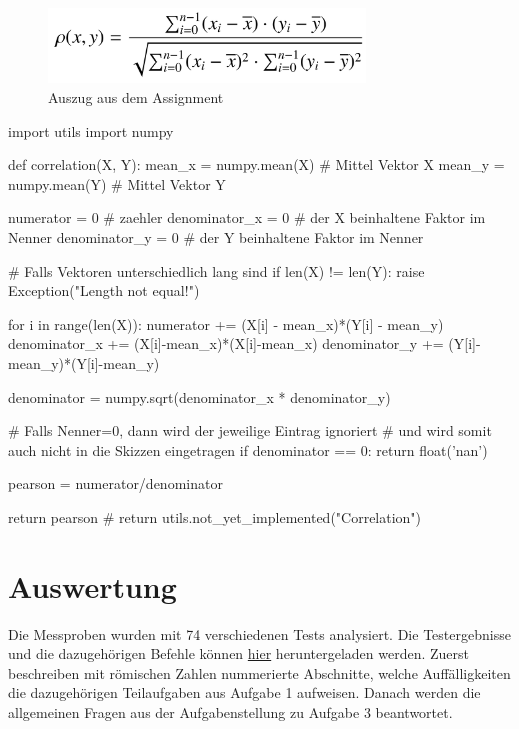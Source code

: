 \documentclass[12pt,a4paper]{article}
\begin{document}
\begin{figure}[hbt!]
	\centering
		\includegraphics[width=0.75\textwidth ]
		{Bilder/a2-pearson-formel.png}
		\caption{Auszug aus dem Assignment}
		\label{fig:Label1}
\end{figure}


\begin{python}
import utils
import numpy


def correlation(X, Y):
    mean_x = numpy.mean(X) # Mittel Vektor X
    mean_y = numpy.mean(Y) # Mittel Vektor Y

    numerator = 0 # zaehler
    denominator_x = 0 # der X beinhaltene Faktor im Nenner
    denominator_y = 0 # der Y beinhaltene Faktor im Nenner

    # Falls Vektoren unterschiedlich lang sind
    if len(X) != len(Y):
        raise Exception("Length not equal!\n")

    for i in range(len(X)):
        numerator += (X[i] - mean_x)*(Y[i] - mean_y)
        denominator_x += (X[i]-mean_x)*(X[i]-mean_x)
        denominator_y += (Y[i]-mean_y)*(Y[i]-mean_y)

    denominator = numpy.sqrt(denominator_x * denominator_y)

    # Falls Nenner=0, dann wird der jeweilige Eintrag ignoriert
    # und wird somit auch nicht in die Skizzen eingetragen
    if denominator == 0:
        return float('nan')

    pearson = numerator/denominator

    return pearson
    # return utils.not_yet_implemented("Correlation")
\end{python}


\newpage
\section{Auswertung}

Die Messproben wurden mit 74 verschiedenen Tests analysiert. 
Die Testergebnisse und die dazugehörigen Befehle können 
\href{https://mega.nz/file/rg4HzTJB#4DSJFln2TZiz9BZ_8xZObXRsGiheQ3Otaf_7wMUAqTQ}
{hier} 
heruntergeladen werden. Zuerst beschreiben mit römischen 
Zahlen nummerierte Abschnitte, welche Auffälligkeiten die 
dazugehörigen Teilaufgaben aus Aufgabe 1 aufweisen. Danach 
werden die allgemeinen Fragen aus der Aufgabenstellung zu 
Aufgabe 3 beantwortet.
\end{document}
